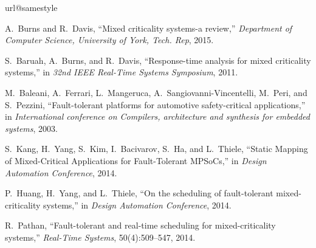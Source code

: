 \documentclass[conference]{IEEEtran}
\begin{document}
\begin{thebibliography}{10}
\providecommand{\url}[1]{#1}
\csname url@samestyle\endcsname
\providecommand{\newblock}{\relax}
\providecommand{\bibinfo}[2]{#2}
\providecommand{\BIBentrySTDinterwordspacing}{\spaceskip=0pt\relax}
\providecommand{\BIBentryALTinterwordstretchfactor}{4}
\providecommand{\BIBentryALTinterwordspacing}{\spaceskip=\fontdimen2\font plus
\BIBentryALTinterwordstretchfactor\fontdimen3\font minus
  \fontdimen4\font\relax}
\providecommand{\BIBforeignlanguage}[2]{{%
\expandafter\ifx\csname l@#1\endcsname\relax
\typeout{** WARNING: IEEEtran.bst: No hyphenation pattern has been}%
\typeout{** loaded for the language `#1'. Using the pattern for}%
\typeout{** the default language instead.}%
\else
\language=\csname l@#1\endcsname
\fi
#2}}
\providecommand{\BIBdecl}{\relax}


A.~Burns and R.~Davis, ``Mixed criticality systems-a review,'' \emph{Department
  of Computer Science, University of York, Tech. Rep}, 2015.

\vspace{-0.5mm}
S.~Baruah, A.~Burns, and R.~Davis, ``Response-time analysis for mixed
  criticality systems,'' in \emph{32nd IEEE Real-Time Systems Symposium}, 2011.


\vspace{-0.5mm}
M.~Baleani, A.~Ferrari, L.~Mangeruca, A.~Sangiovanni-Vincentelli, M.~Peri, and S.~Pezzini,
 ``Fault-tolerant platforms for automotive safety-critical applications,'' in \emph{International conference
 on Compilers, architecture and synthesis for embedded systems}, 2003.



\vspace{-0.5mm}
S.~Kang, H.~Yang, S.~Kim, I.~Bacivarov, S.~Ha, and L.~Thiele,
``Static Mapping of Mixed-Critical Applications for Fault-Tolerant MPSoCs,''
in \emph{Design Automation Conference}, 2014.


\vspace{-0.5mm}
P.~Huang, H.~Yang, and L.~Thiele, ``On the scheduling of fault-tolerant
  mixed-criticality systems,'' in \emph{Design Automation Conference}, 2014.

\vspace{-0.5mm}
R.~Pathan, ``Fault-tolerant and real-time scheduling for mixed-criticality systems,''
  \emph{Real-Time Systems}, 50(4):509--547, 2014.


\end{thebibliography}
\end{document}

